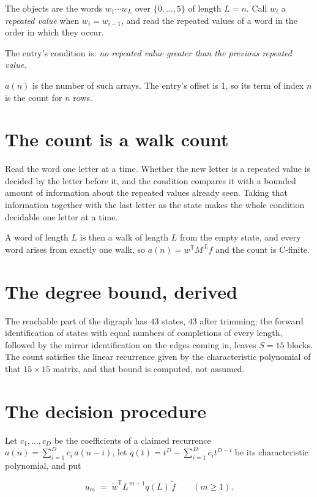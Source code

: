 \documentclass[11pt]{article}
\theoremstyle{definition}
\begin{document}
The objects are the words $w_1\cdots w_L$ over $\{0,\dots,5\}$ of length $L = n$. Call $w_i$ a {\itshape repeated value} when $w_i = w_{i-1}$, and read the repeated values of a word in the order in which they occur.

The entry's condition is: {\itshape no repeated value greater than the previous repeated value}.

$a(n)$ is the number of such arrays. The entry's offset is 1, so its term of index $n$ is the count for $n$ rows.

\section{The count is a walk count}

Read the word one letter at a time. Whether the new letter is a repeated value is decided by the letter before it, and the condition compares it with a bounded amount of information about the repeated values already seen. Taking that information together with the last letter as the state makes the whole condition decidable one letter at a time.

A word of length $L$ is then a walk of length $L$ from the empty state, and every word arises from exactly one walk, so $a(n) = w^{\mathsf T}M^{\,L}f$ and the count is C-finite.

\section{The degree bound, derived}

The reachable part of the digraph has $43$ states, $43$ after trimming; the forward identification of states with equal numbers of completions of every length, followed by the mirror identification on the edges coming in, leaves $S = 15$ blocks. The count satisfies the linear recurrence given by the characteristic polynomial of that $15\times15$ matrix, and that bound is computed, not assumed.

\section{The decision procedure}

Let $c_1,\dots,c_D$ be the coefficients of a claimed recurrence $a(n) = \sum_{i=1}^{D} c_i\,a(n-i)$, let $q(t) = t^{D} - \sum_{i=1}^{D} c_i t^{D-i}$ be its characteristic polynomial, and put

\[u_m \;=\; \tilde w^{\mathsf T} L^{\,m-1} q(L)\,\tilde f \qquad (m \ge 1).\]
\end{document}
